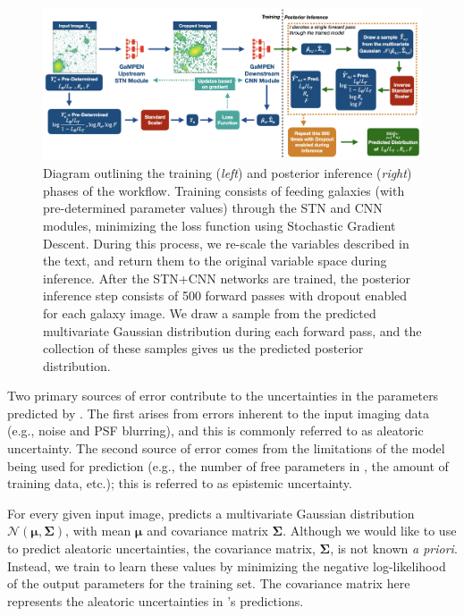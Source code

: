 \begin{figure}[htb]
    \centering
    \includegraphics[width
    =\textwidth]{posterior_pred_workflow.png}
    \caption{Diagram outlining the training (\textit{left}) and posterior inference (\textit{right}) phases of the \gampen{} workflow. Training consists of feeding galaxies (with pre-determined parameter values) through the STN and CNN modules, minimizing the loss function using Stochastic Gradient Descent. 
    During this process, we re-scale the variables described in the text, and return them to the original variable space during inference.
    After the STN+CNN networks are trained, the posterior inference step consists of 500 forward passes with dropout enabled for each galaxy image. We draw a sample from the predicted multivariate Gaussian distribution during each forward pass, and the collection of these samples gives us the predicted posterior distribution.}
    \label{fig_c3:posterior_pred_workflow}
\end{figure}

Two primary sources of error contribute to the uncertainties in the parameters predicted by \gampen{}. The first arises from errors inherent to the input imaging data (e.g., noise and PSF blurring), and this is commonly referred to as aleatoric uncertainty. The second source of error comes from the limitations of the model being used for prediction (e.g., the number of free parameters in \gampen{}, the amount of training data, etc.); this is referred to as epistemic uncertainty. 

For every given input image, \gampen{} predicts a multivariate Gaussian distribution $\mathcal{N}(\boldsymbol{\mu}, \boldsymbol{\Sigma})$, with mean $\boldsymbol{\mu}$ and covariance matrix $\boldsymbol{\Sigma}$. Although we would like to use \gampen{} to predict aleatoric uncertainties, the covariance matrix, $\boldsymbol{\Sigma}$, is not known {\it a priori}. Instead, we train \gampen{} to learn these values by minimizing the negative log-likelihood of the output parameters for the training set. The covariance matrix here represents the aleatoric uncertainties in \gampen{}'s predictions.

